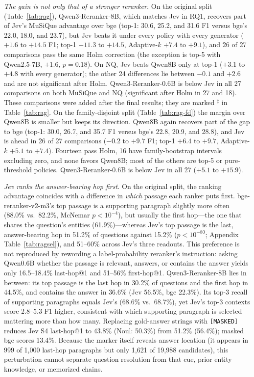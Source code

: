\emph{The gain is not only that of a stronger reranker.} On the original split (Table~\ref{tab:rag}), Qwen3-Reranker-8B, which matches Jev in RQ1, recovers part of Jev's MuSiQue advantage over bge (top-1: 30.6, 25.2, and 31.6 F1 versus bge's 22.0, 18.0, and 23.7), but Jev beats it under every policy with every generator ($+1.6$ to $+14.5$ F1; top-1 $+11.3$ to $+14.5$, Adaptive-$k$ $+7.4$ to $+9.1$), and 26 of 27 comparisons pass the same Holm correction (the exception is top-5 with Qwen2.5-7B, $+1.6$, $p=0.18$). On NQ, Jev beats Qwen8B only at top-1 ($+3.1$ to $+4.8$ with every generator); the other 24 differences lie between $-0.1$ and $+2.6$ and are not significant after Holm. Qwen3-Reranker-0.6B is below Jev in all 27 comparisons on both MuSiQue and NQ (significant after Holm in 27 and 18). These comparisons were added after the final results; they are marked $^\ddagger$ in Table~\ref{tab:rag}. On the family-disjoint split (Table~\ref{tab:rag-fd}) the margin over Qwen8B is smaller but keeps its direction. Qwen8B again recovers part of the gap to bge (top-1: 30.0, 26.7, and 35.7 F1 versus bge's 22.8, 20.9, and 28.8), and Jev is ahead in 26 of 27 comparisons ($-0.2$ to $+9.7$ F1; top-1 $+6.4$ to $+9.7$, Adaptive-$k$ $+5.1$ to $+7.4$). Fourteen pass Holm, 16 have family-bootstrap intervals excluding zero, and none favors Qwen8B; most of the others are top-5 or pure-threshold policies. Qwen3-Reranker-0.6B is below Jev in all 27 ($+5.1$ to $+15.9$).

\emph{Jev ranks the answer-bearing hop first.} On the original split, the ranking advantage coincides with a difference in \emph{which} passage each ranker puts first. bge-reranker-v2-m3's top passage is a supporting paragraph slightly more often (88.0\% vs.\ 82.2\%, McNemar $p<10^{-4}$), but usually the first hop---the one that shares the question's entities (61.9\%)---whereas Jev's top passage is the last, answer-bearing hop in 51.2\% of questions against 15.2\% ($p<10^{-80}$; Appendix Table~\ref{tab:ragsel}), and 51--60\% across Jev's three readouts.
This preference is not reproduced by rewording a label-probability reranker's instruction: asking Qwen0.6B whether the passage is relevant, answers, or contains the answer yields only 16.5--18.4\% last-hop@1 and 51--56\% first-hop@1. Qwen3-Reranker-8B lies in between: its top passage is the last hop in 30.2\% of questions and the first hop in 44.5\%, and contains the answer in 36.6\% (Jev 56.5\%, bge 22.3\%). Its top-3 recall of supporting paragraphs equals Jev's (68.6\% vs.\ 68.7\%), yet Jev's top-3 contexts score 2.8--5.3 F1 higher, consistent with which supporting paragraph is selected mattering more than how many.
Replacing gold-answer strings with \texttt{[MASKED]} reduces Jev S4 last-hop@1 to 43.8\% (Noul: 50.3\%) from 51.2\% (56.4\%); masked bge scores 13.4\%. Because the marker itself reveals answer location (it appears in 999 of 1{,}000 last-hop paragraphs but only 1{,}621 of 19{,}988 candidates), this perturbation cannot separate question resolution from that cue, prior entity knowledge, or memorized chains.

